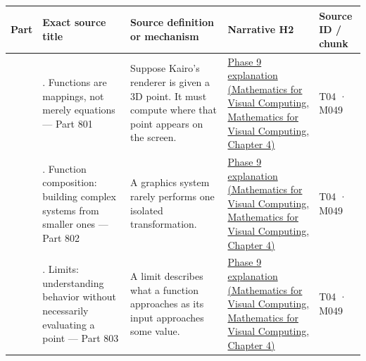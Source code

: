 {\def\LTcaptype{none} %
\begin{longtable}[]{@{}
  >{\raggedleft\arraybackslash}p{}
  >{\raggedright\arraybackslash}p{}
  >{\raggedright\arraybackslash}p{}
  >{\raggedright\arraybackslash}p{}
  >{\raggedright\arraybackslash}p{}@{}}
\toprule\noalign{}
\begin{minipage}[b]{\linewidth}\raggedleft
Part
\end{minipage} & \begin{minipage}[b]{\linewidth}\raggedright
Exact source title
\end{minipage} & \begin{minipage}[b]{\linewidth}\raggedright
Source definition or mechanism
\end{minipage} & \begin{minipage}[b]{\linewidth}\raggedright
Narrative H2
\end{minipage} & \begin{minipage}[b]{\linewidth}\raggedright
Source ID / chunk
\end{minipage} \\
\midrule\noalign{}
\endhead
\bottomrule\noalign{}
\endlastfoot
801 & 1. Functions are mappings, not merely equations --- Part 801 & Suppose Kairo's renderer is given a 3D point. It must compute where that point appears on the screen. & \href{../02-Mathematics-for-Visual-Computing/main.pdf\#nameddest=01-foundations-i-ch020-functions-limits-continuity-and-scalar-change}{Phase 9 explanation (Mathematics for Visual Computing, Mathematics for Visual Computing, Chapter 4)} & T04 · M049 \\
802 & 2. Function composition: building complex systems from smaller ones --- Part 802 & A graphics system rarely performs one isolated transformation. & \href{../02-Mathematics-for-Visual-Computing/main.pdf\#nameddest=01-foundations-i-ch020-functions-limits-continuity-and-scalar-change}{Phase 9 explanation (Mathematics for Visual Computing, Mathematics for Visual Computing, Chapter 4)} & T04 · M049 \\
803 & 3. Limits: understanding behavior without necessarily evaluating a point --- Part 803 & A limit describes what a function approaches as its input approaches some value. & \href{../02-Mathematics-for-Visual-Computing/main.pdf\#nameddest=01-foundations-i-ch020-functions-limits-continuity-and-scalar-change}{Phase 9 explanation (Mathematics for Visual Computing, Mathematics for Visual Computing, Chapter 4)} & T04 · M049 \\

\end{longtable}}
